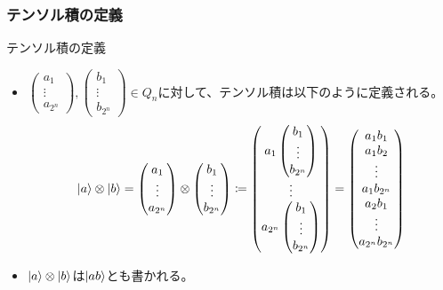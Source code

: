 \documentclass[9pt]{beamer}
\begin{document}
\begin{frame}
  \frametitle{テンソル積の定義}
  \begin{block}{テンソル積の定義}
    \begin{itemize}
      \item $\begin{pmatrix} a_1 \\ \vdots \\ a_{2^n} \end{pmatrix}, \begin{pmatrix}b_1 \\ \vdots \\ b_{2^n} \end{pmatrix} \in Q_n$に対して、テンソル積は以下のように定義される。
      \[\ket{a}\otimes \ket{b} = \begin{pmatrix}a_1\\ \vdots \\ a_{2^n} \end{pmatrix} \otimes \begin{pmatrix}b_1\\ \vdots \\ b_{2^n} \end{pmatrix} \coloneq \begin{pmatrix}a_1 \begin{pmatrix}b_1 \\ \vdots \\ b_{2^n} \end{pmatrix} \\ \vdots \\ a_{2^n} \begin{pmatrix}b_1 \\ \vdots \\ b_{2^n} \end{pmatrix} \end{pmatrix} = \begin{pmatrix}a_1 b_1 \\ a_1 b_2 \\ \vdots \\ a_1 b_{2^n} \\ a_2 b_1 \\ \vdots \\ a_{2^n} b_{2^n} \end{pmatrix}\]
      
      \item $\ket{a}\otimes \ket{b}$は$\ket{ab}$とも書かれる。
    \end{itemize}
  \end{block}
\end{frame}
\end{document}

